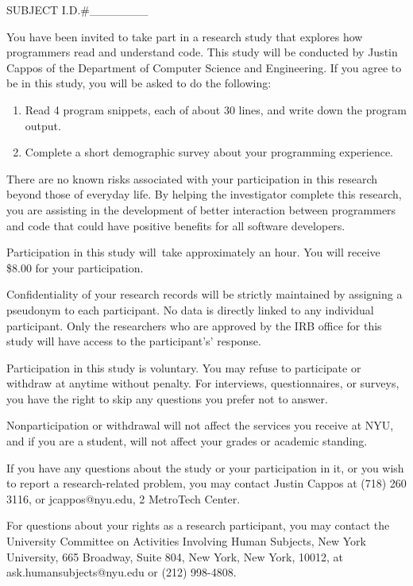 \documentclass[]{article}
\date{}
\providecommand{\tightlist}{%
  \setlength{\itemsep}{0pt}\setlength{\parskip}{0pt}}
\begin{document}
{SUBJECT I.D.\#\_\_\_\_\_\_\_}

{You have been invited to take part in a research study that explores
how programmers read and understand code. This study will be conducted
by Justin Cappos of the Department of Computer Science and Engineering.
If you agree to be in this study, you will be asked to do the
following:}

\begin{enumerate}
\tightlist
\item
  {Read 4 program snippets, each of about 30 lines, and write down the
  program output.}
\item
  {Complete a short demographic survey about your programming
  experience.}
\end{enumerate}

{There are no known risks associated with your participation in this
research beyond those of everyday life. By helping the investigator
complete this research, you are assisting in the development of better
interaction between programmers and code that could have positive
benefits for all software developers.}

{Participation in this study }{will}{~take approximately an hour. }{You
will receive \$8.00 for your participation.}{~}

{Confidentiality of your research records will be strictly maintained by
assigning a pseudonym to each participant. No data is directly linked to
any individual participant. Only the researchers who are approved by the
IRB office for this study will have access to the participant's'
response.}

{Participation in this study is voluntary. You may refuse to participate
or withdraw at anytime without penalty. For interviews, questionnaires,
or surveys, you have the right to skip any questions you prefer not to
answer.}

{Nonparticipation or withdrawal will not affect the services you receive
at NYU, and if you are a student, will not affect your grades or
academic standing.}

{If you have any questions about the study or your participation in it,
or you wish to report a research-related problem, you may contact Justin
Cappos at (718) 260 3116, or jcappos@nyu.edu, 2 MetroTech Center.}

{For questions about your rights as a research participant, you may
contact the University Committee on Activities Involving Human Subjects,
New York University, 665 Broadway, Suite 804, New York, New York, 10012,
at ask.humansubjects@nyu.edu or (212) 998-4808.}
\end{document}
